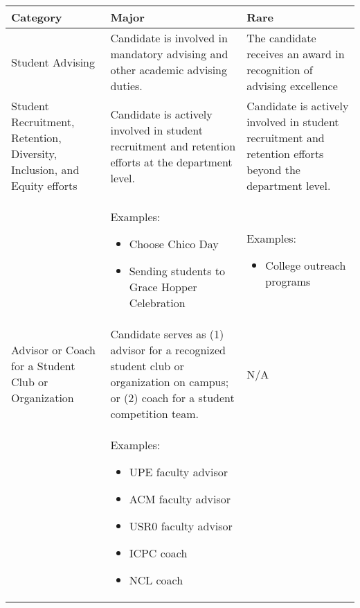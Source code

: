 \documentclass{article}
\begin{document}
\begin{longtable}{p{3cm}p{5.5cm}P{5.5cm}}

\hline
\textbf{Category} & \textbf{Major} & \textbf{Rare}\\
\hline
\endhead %
 Student Advising
 & Candidate is involved in mandatory advising and other academic advising duties. %
 & The candidate receives an award in recognition of advising excellence \\ 
 \hline
 Student   Recruitment, Retention, Diversity, Inclusion, and Equity efforts & Candidate is actively involved in student recruitment and retention efforts at the department level. & Candidate is actively involved in student recruitment and retention efforts beyond the department level. \\
 &
 Examples:
	\begin{itemize}[noitemsep,leftmargin=*,topsep=0pt,partopsep=0pt]
    \item Choose Chico Day
    \item Sending students to Grace Hopper Celebration
	\end{itemize}
  & %
  Examples:
    \begin{itemize}[noitemsep,leftmargin=*,topsep=0pt,partopsep=0pt]
        \item College outreach programs
    \end{itemize}\\ 
\hline
Advisor or Coach for a Student Club or Organization & Candidate serves as (1) advisor for a recognized student club or organization on campus; or (2) coach for a student competition team. & N/A \\
& Examples:
	\begin{itemize}[noitemsep,leftmargin=*,topsep=0pt,partopsep=0pt]
    \item UPE faculty advisor
    \item ACM faculty advisor
    \item USR0 faculty advisor
    \item ICPC coach
    \item NCL coach


\end{itemize}
\end{longtable}
\end{document}

